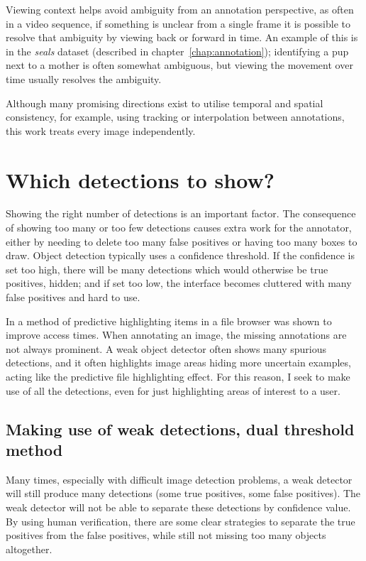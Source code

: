 Viewing context helps avoid ambiguity from an annotation perspective, as often in a video sequence, if something is unclear from a single frame it is possible to resolve that ambiguity by viewing back or forward in time. An example of this is in the \emph{seals} dataset (described in chapter~\ref{chap:annotation}); identifying a pup next to a mother is often somewhat ambiguous, but viewing the movement over time usually resolves the ambiguity.

Although many promising directions exist to utilise temporal and spatial consistency, for example, using tracking or interpolation between annotations, this work treats every image independently. 


\section {Which detections to show?}
\label{sec:thresholding}

Showing the right number of detections is an important factor. The consequence of showing too many or too few detections causes extra work for the annotator, either by needing to delete too many false positives or having too many boxes to draw. Object detection typically uses a confidence threshold. If the confidence is set too high, there will be many detections which would otherwise be true positives, hidden; and if set too low, the interface becomes cluttered with many false positives and hard to use.

In \cite{Fitchett2013} a method of predictive highlighting items in a file browser was shown to improve access times. When annotating an image, the missing annotations are not always prominent. A weak object detector often shows many spurious detections, and it often highlights image areas hiding more uncertain examples, acting like the predictive file highlighting effect. For this reason, I seek to make use of all the detections, even for just highlighting areas of interest to a user. 

\subsection{Making use of weak detections, dual threshold method}

 Many times, especially with difficult image detection problems, a weak detector will still produce many detections (some true positives, some false positives). The weak detector will not be able to separate these detections by confidence value. By using human verification, there are some clear strategies to separate the true positives from the false positives, while still not missing too many objects altogether. 

